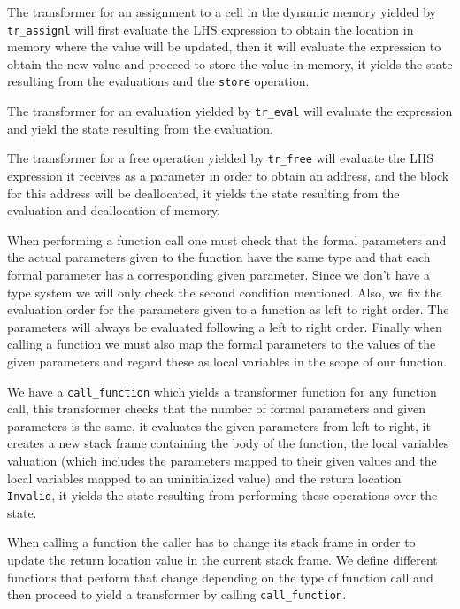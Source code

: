 The transformer for an assignment to a cell in the dynamic memory yielded by \verb|tr_assignl| will first evaluate the LHS expression to obtain the location in memory where the value will be updated, then it will evaluate the expression to obtain the new value and proceed to store the value in memory, it yields the state resulting from the evaluations and the \verb|store| operation.

The transformer for an evaluation yielded by \verb|tr_eval| will evaluate the expression and yield the state resulting from the evaluation.

The transformer for a free operation yielded by \verb|tr_free| will evaluate the LHS expression it receives as a parameter in order to obtain an address, and the block for this address will be deallocated, it yields the state resulting from the evaluation and deallocation of memory.

When performing a function call one must check that the formal parameters and the actual parameters given to the function have the same type and that each formal parameter has a corresponding given parameter.
Since we don't have a type system we will only check the second condition mentioned.
Also, we fix the evaluation order for the parameters given to a function as left to right order.
The parameters will always be evaluated following a left to right order.
Finally when calling a function we must also map the formal parameters to the values of the given parameters and regard these as local variables in the scope of our function.

We have a \verb|call_function| which yields a transformer function for any function call, this transformer checks that the number of formal parameters and given parameters is the same, it evaluates the given parameters from left to right, it creates a new stack frame containing the body of the function, the local variables valuation (which includes the parameters mapped to their given values and the local variables mapped to an uninitialized value) and the return location \verb|Invalid|, it yields the state resulting from performing these operations over the state.

When calling a function the caller has to change its stack frame in order to update the return location value in the current stack frame.
We define different functions that perform that change depending on the type of function call and then proceed to yield a transformer by calling \verb|call_function|.

\begin{comment}
I should also explain here why function calls always return to a dummy variable, right?
\end{comment}

